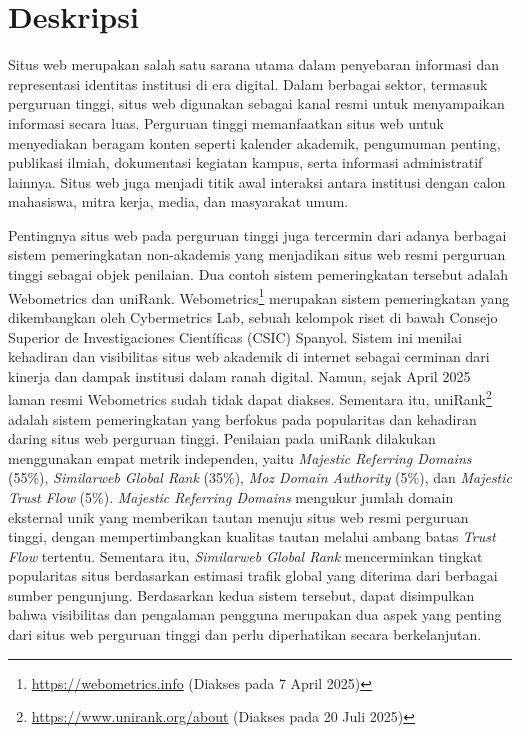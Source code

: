 \documentclass[a4paper,twoside]{article}
\begin{document}
\title{\@judultopik}
\author{\nama \textendash \@npm} 

\newcommand{\nama}{Ade Rimbo Spencher}
\newcommand{\@npm}{6182001060}
\newcommand{\@judultopik}{Pengembangan Aplikasi Desktop Pemeriksaan Tautan Rusak pada Situs Web} %
\newcommand{\jumpemb}{1} %
\newcommand{\tanggal}{25/09/2025}

\maketitle


\section{Deskripsi}
Situs web merupakan salah satu sarana utama dalam penyebaran informasi dan representasi identitas institusi di era digital. Dalam berbagai sektor, termasuk perguruan tinggi, situs web digunakan sebagai kanal resmi untuk menyampaikan informasi secara luas. Perguruan tinggi memanfaatkan situs web untuk menyediakan beragam konten seperti kalender akademik, pengumuman penting, publikasi ilmiah, dokumentasi kegiatan kampus, serta informasi administratif lainnya. Situs web juga menjadi titik awal interaksi antara institusi dengan calon mahasiswa, mitra kerja, media, dan masyarakat umum.

Pentingnya situs web pada perguruan tinggi juga tercermin dari adanya berbagai sistem pemeringkatan non-akademis yang menjadikan situs web resmi perguruan tinggi sebagai objek penilaian. Dua contoh sistem pemeringkatan tersebut adalah Webometrics dan uniRank. Webometrics\footnote{\url{https://webometrics.info} (Diakses pada 7 April 2025)} merupakan sistem pemeringkatan yang dikembangkan oleh Cybermetrics Lab, sebuah kelompok riset di bawah Consejo Superior de Investigaciones Científicas (CSIC) Spanyol. Sistem ini menilai kehadiran dan visibilitas situs web akademik di internet sebagai cerminan dari kinerja dan dampak institusi dalam ranah digital. Namun, sejak April 2025 laman resmi Webometrics sudah tidak dapat diakses. Sementara itu, uniRank\footnote{\url{https://www.unirank.org/about} (Diakses pada 20 Juli 2025)} adalah sistem pemeringkatan yang berfokus pada popularitas dan kehadiran daring situs web perguruan tinggi. Penilaian pada uniRank dilakukan menggunakan empat metrik independen, yaitu \textit{Majestic Referring Domains} (55\%), \textit{Similarweb Global Rank} (35\%), \textit{Moz Domain Authority} (5\%), dan \textit{Majestic Trust Flow} (5\%). \textit{Majestic Referring Domains} mengukur jumlah domain eksternal unik yang memberikan tautan menuju situs web resmi perguruan tinggi, dengan mempertimbangkan kualitas tautan melalui ambang batas \textit{Trust Flow} tertentu. Sementara itu, \textit{Similarweb Global Rank} mencerminkan tingkat popularitas situs berdasarkan estimasi trafik global yang diterima dari berbagai sumber pengunjung. Berdasarkan kedua sistem tersebut, dapat disimpulkan bahwa visibilitas dan pengalaman pengguna merupakan dua aspek yang penting dari situs web perguruan tinggi dan perlu diperhatikan secara berkelanjutan.
\end{document}
